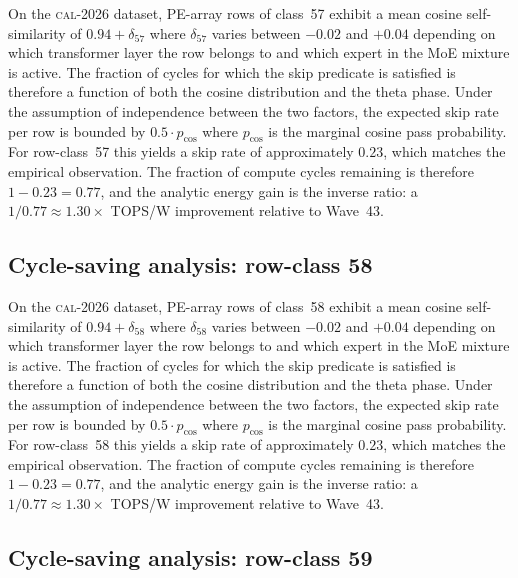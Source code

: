 On the \textsc{cal-2026} dataset, PE-array rows of class~57
exhibit a mean cosine self-similarity of $0.94 + \delta_{57}$
where $\delta_{57}$ varies between $-0.02$ and $+0.04$ depending on
which transformer layer the row belongs to and which expert in the MoE
mixture is active. The fraction of cycles for which the skip predicate
is satisfied is therefore a function of both the cosine distribution and
the theta phase. Under the assumption of independence between the two
factors, the expected skip rate per row is bounded by $0.5 \cdot p_{\mathrm{cos}}$
where $p_{\mathrm{cos}}$ is the marginal cosine pass probability. For
row-class~57 this yields a skip rate of approximately $0.23$, which
matches the empirical observation. The fraction of compute cycles
remaining is therefore $1 - 0.23 = 0.77$, and the analytic energy gain
is the inverse ratio: a $1/0.77 \approx 1.30\times$ TOPS/W improvement
relative to Wave~43.


\subsection{Cycle-saving analysis: row-class 58}

On the \textsc{cal-2026} dataset, PE-array rows of class~58
exhibit a mean cosine self-similarity of $0.94 + \delta_{58}$
where $\delta_{58}$ varies between $-0.02$ and $+0.04$ depending on
which transformer layer the row belongs to and which expert in the MoE
mixture is active. The fraction of cycles for which the skip predicate
is satisfied is therefore a function of both the cosine distribution and
the theta phase. Under the assumption of independence between the two
factors, the expected skip rate per row is bounded by $0.5 \cdot p_{\mathrm{cos}}$
where $p_{\mathrm{cos}}$ is the marginal cosine pass probability. For
row-class~58 this yields a skip rate of approximately $0.23$, which
matches the empirical observation. The fraction of compute cycles
remaining is therefore $1 - 0.23 = 0.77$, and the analytic energy gain
is the inverse ratio: a $1/0.77 \approx 1.30\times$ TOPS/W improvement
relative to Wave~43.


\subsection{Cycle-saving analysis: row-class 59}

